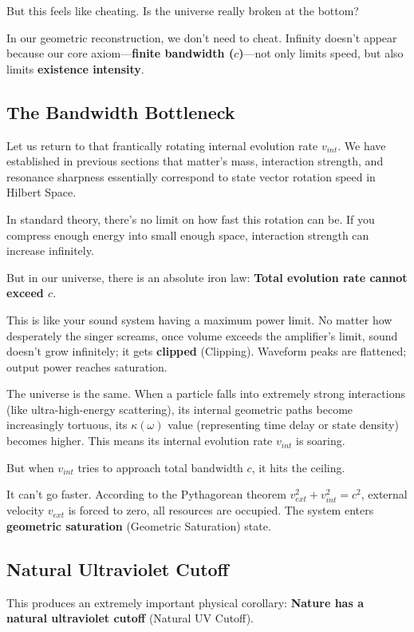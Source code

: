 \documentclass[11pt,a4paper,twoside]{book}
\begin{document}
But this feels like cheating. Is the universe really broken at the bottom?

In our geometric reconstruction, we don't need to cheat. Infinity doesn't appear because our core axiom---\textbf{finite bandwidth ($c$)}---not only limits speed, but also limits \textbf{existence intensity}.

\subsection{The Bandwidth Bottleneck}

Let us return to that frantically rotating internal evolution rate $v_{int}$. We have established in previous sections that matter's mass, interaction strength, and resonance sharpness essentially correspond to state vector rotation speed in Hilbert Space.

In standard theory, there's no limit on how fast this rotation can be. If you compress enough energy into small enough space, interaction strength can increase infinitely.

But in our universe, there is an absolute iron law: \textbf{Total evolution rate cannot exceed $c$}.

This is like your sound system having a maximum power limit. No matter how desperately the singer screams, once volume exceeds the amplifier's limit, sound doesn't grow infinitely; it gets \textbf{clipped} (Clipping). Waveform peaks are flattened; output power reaches saturation.

The universe is the same. When a particle falls into extremely strong interactions (like ultra-high-energy scattering), its internal geometric paths become increasingly tortuous, its $\kappa(\omega)$ value (representing time delay or state density) becomes higher. This means its internal evolution rate $v_{int}$ is soaring.

But when $v_{int}$ tries to approach total bandwidth $c$, it hits the ceiling.

It can't go faster. According to the Pythagorean theorem $v_{ext}^2 + v_{int}^2 = c^2$, external velocity $v_{ext}$ is forced to zero, all resources are occupied. The system enters \textbf{geometric saturation} (Geometric Saturation) state.

\subsection{Natural Ultraviolet Cutoff}

This produces an extremely important physical corollary: \textbf{Nature has a natural ultraviolet cutoff} (Natural UV Cutoff).
\end{document}
